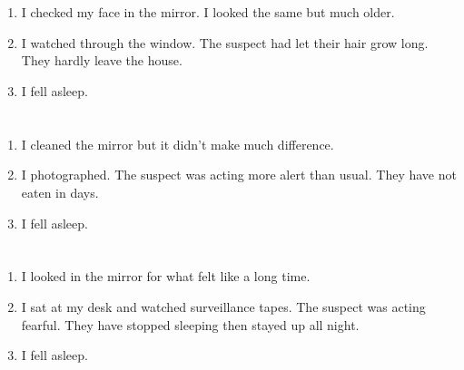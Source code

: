 \documentclass{article}
\begin{document}
    \newpage
    
    \section{}
    
    \begin{enumerate}
    
    \item I checked my face in the mirror. I looked the same but much older.\\
    
    \item I watched through the window. The suspect had let their hair grow long. They hardly leave the house.\\
    
    \item I fell asleep.\\
    
    \end{enumerate}
     
    \newpage
    
    \section{}
    
    \begin{enumerate}
    
    \item I cleaned the mirror but it didn't make much difference.\\
    
    \item I photographed. The suspect was acting more alert than usual. They have not eaten in days.\\
    
    \item I fell asleep.\\
    
    \end{enumerate}
     
    \newpage
    
    \section{}
    
    \begin{enumerate}
    
    \item I looked in the mirror for what felt like a long time.\\
    
    \item I sat at my desk and watched surveillance tapes. The suspect was acting fearful. They have stopped sleeping then stayed up all night.\\
    
    \item I fell asleep.\\
    
    \end{enumerate}
     
\end{document}
